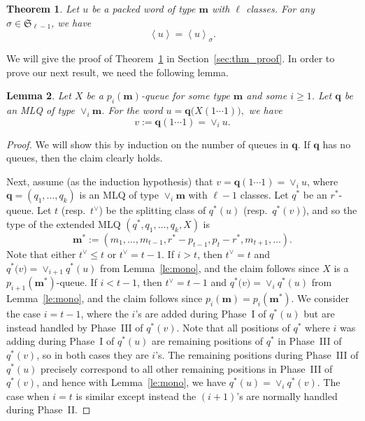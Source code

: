 \documentclass[reqno]{amsart}
\newcommand{\0}{\phantom{c}}
\newcommand{\swt}[1]{\left\langle #1 \right\rangle} %
\newcommand{\merge}[1]{\vee_{#1}} %
\newcommand{\SymGp}[1]{\mathfrak{S}_{#1}} %
\newcommand{\mm}{\mathbf{m}}
\newcommand{\qq}{\mathbf{q}}
\theoremstyle{plain}
\newtheorem{thm}{Theorem}[section]
\newtheorem{lemma}[thm]{Lemma}
\theoremstyle{definition}
\numberwithin{equation}{section}
\begin{document}
\begin{thm}
\label{thm:permutation}
  Let $u$ be a packed word of type $\mm$ with $\ell$ classes.
  For any $\sigma \in \SymGp{\ell-1}$, we have 
  \[
  \swt{u} = \swt{u}_{\sigma}.
  \]
\end{thm}

We will give the proof of Theorem~\ref{thm:permutation} in Section~\ref{sec:thm_proof}.
In order to prove our next result, we need the following lemma.

\begin{lemma}
\label{lemma:queue_merge}
  Let $X$ be a $p_i(\mm)$-queue for some type $\mm$ and some $i \geq 1$.
  Let $\qq$ be an MLQ of type $\merge{i}\mm$.
  For the word
  $
  u = \qq\bigl( X(1 \dotsm 1) \bigr),
  $
  we have
  \[
  v := \qq(1 \dotsm 1) = \merge{i} u.
  \]
\end{lemma}

\begin{proof}
  We will show this by induction on the number of queues in $\qq$.
  If $\qq$ has no queues, then the claim clearly holds.
  
  Next, assume (as the induction hypothesis) that $v = \qq(1 \dotsm 1) = \merge{i} u$, where $\qq = (q_1, \dotsc, q_k)$ is an MLQ of type $\merge{i}\mm$ with $\ell - 1$ classes.
  Let $q^*$ be an $r^*$-queue. %
  Let $t$ (resp.~$t^{\vee}$) be the splitting class of $q^*(u)$ (resp.~$q^*(v)$), and so the type of the extended MLQ $(q^*, q_1, \dotsc, q_k, X)$ is
  \[
  \mm^* := (m_1, \dotsc, m_{t-1}, r^* - p_{t-1}, p_t - r^*, m_{t+1}, \ldots).
  \]
  Note that either $t^{\vee} \leq t$ or $t^{\vee} = t - 1$.
  If $i > t$, then $t^{\vee} = t$ and $q^*\bigl(v) = \merge{i+1} q^*(u)$ from Lemma~\ref{le:mono}, and the claim follows since $X$ is a $p_{i+1}(\mm^*)$-queue.
  If $i < t - 1$, then $t^{\vee} = t - 1$ and $q^*\bigl(v) = \merge{i} q^*(u)$ from Lemma~\ref{le:mono}, and the claim follows since $p_i(\mm) = p_i(\mm^*)$.
  We consider the case $i = t - 1$, where the $i$'s are added during Phase~I of $q^*(u)$ but are instead handled by Phase~III of $q^*(v)$.
  Note that all positions of $q^*$ where $i$ was adding during Phase~I of $q^*(u)$ are remaining positions of $q^*$ in Phase~III of $q^*(v)$, so in both cases they are $i$'s.
  The remaining positions during Phase~III of $q^*(u)$ precisely correspond to all other remaining positions in Phase~III of $q^*(v)$, and hence with Lemma~\ref{le:mono}, we have $q^*(u) = \merge{i} q^*(v)$.
  The case when $i = t$ is similar except instead the $(i+1)$'s are normally handled during Phase~II.
\end{proof}
\end{document}
